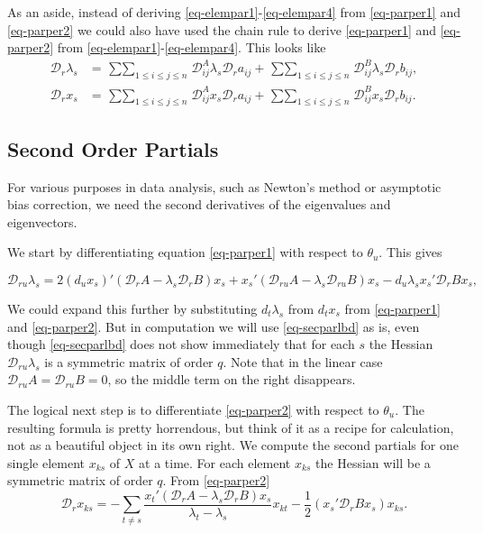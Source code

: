 \documentclass[
  12pt,
  letterpaper,
  DIV=11,
  numbers=noendperiod]{scrartcl}
\begin{document}
As an aside, instead of deriving \eqref{eq-elempar1}-\eqref{eq-elempar4}
from \eqref{eq-parper1} and \eqref{eq-parper2} we could also have used
the chain rule to derive \eqref{eq-parper1} and \eqref{eq-parper2} from
\eqref{eq-elempar1}-\eqref{eq-elempar4}. This looks like
\begin{subequations}
\begin{align}
\mathcal{D}_r\lambda_s&=\mathop{\sum\sum}_{1\leq i\leq j\leq n}\mathcal{D}_{ij}^A\lambda_s\mathcal{D}_ra_{ij}+\mathop{\sum\sum}_{1\leq i\leq j\leq n}\mathcal{D}_{ij}^B\lambda_s\mathcal{D}_rb_{ij},\label{eq-elemchain1}\\
\mathcal{D}_rx_s&=\mathop{\sum\sum}_{1\leq i\leq j\leq n}\mathcal{D}_{ij}^Ax_s\mathcal{D}_ra_{ij}+\mathop{\sum\sum}_{1\leq i\leq j\leq n}\mathcal{D}_{ij}^Bx_s\mathcal{D}_rb_{ij}.\label{eq-elemchain2}
\end{align}
\end{subequations}

\subsection{Second Order Partials}\label{sec-second}

For various purposes in data analysis, such as Newton's method or
asymptotic bias correction, we need the second derivatives of the
eigenvalues and eigenvectors.

We start by differentiating equation \eqref{eq-parper1} with respect to
\(\theta_u\). This gives

\begin{equation}
\mathcal{D}_{ru}\lambda_s=2(d_ux_s)'(\mathcal{D}_rA-\lambda_s\mathcal{D}_rB)x_s+
x_s'(\mathcal{D}_{ru}A-\lambda_s\mathcal{D}_{ru}B)x_s-d_u\lambda_sx_s'\mathcal{D}_rBx_s,
\label{eq-secparlbd}\end{equation}

We could expand this further by substituting \(d_t\lambda_s\) from
\(d_tx_s\) from \eqref{eq-parper1} and \eqref{eq-parper2}. But in
computation we will use \eqref{eq-secparlbd} as is, even though
\eqref{eq-secparlbd} does not show immediately that for each \(s\) the
Hessian \(\mathcal{D}_{ru}\lambda_s\) is a symmetric matrix of order
\(q\). Note that in the linear case
\(\mathcal{D}_{ru}A=\mathcal{D}_{ru}B=0\), so the middle term on the
right disappears.

The logical next step is to differentiate \eqref{eq-parper2} with
respect to \(\theta_u\). The resulting formula is pretty horrendous, but
think of it as a recipe for calculation, not as a beautiful object in
its own right. We compute the second partials for one single element
\(x_{ks}\) of \(X\) at a time. For each element \(x_{ks}\) the Hessian
will be a symmetric matrix of order \(q\). From \eqref{eq-parper2}
\begin{equation}
\mathcal{D}_rx_{ks}=-\sum_{t\not= s}\frac{x_t'(\mathcal{D}_rA-\lambda_s\mathcal{D}_rB)x_s}{\lambda_t-\lambda_s}x_{kt}-\frac12(x_s'\mathcal{D}_rBx_s)x_{ks}.\label{eq-parper3}
\end{equation}
\end{document}
